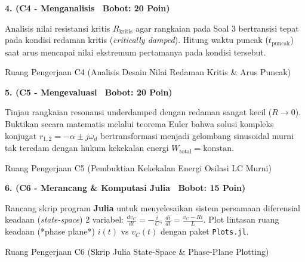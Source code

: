 \documentclass[10pt,a4paper]{article}
\begin{document}
\noindent\textbf{4. (C4 - Menganalisis \textbar\ Bobot: 20 Poin)}\par\vspace{0.5mm}
{\footnotesize Analisis nilai resistansi kritis $R_{\text{kritis}}$ agar rangkaian pada Soal 3 bertransisi tepat pada kondisi redaman kritis (\textit{critically damped}). Hitung waktu puncak ($t_{\text{puncak}}$) saat arus mencapai nilai ekstremum pertamanya pada kondisi tersebut.}
\begin{answerbox}{Ruang Pengerjaan C4 (Analisis Desain Nilai Redaman Kritis \& Arus Puncak)}
  \vspace{3.8cm}
\end{answerbox}

\vspace{1.5mm}

\noindent\textbf{5. (C5 - Mengevaluasi \textbar\ Bobot: 20 Poin)}\par\vspace{0.5mm}
{\footnotesize Tinjau rangkaian resonansi underdamped dengan redaman sangat kecil ($R \to 0$). Buktikan secara matematis melalui teorema Euler bahwa solusi kompleks konjugat $r_{1,2} = -\alpha \pm j\omega_d$ bertransformasi menjadi gelombang sinusoidal murni tak teredam dengan hukum kekekalan energi $W_{\text{total}} = \text{konstan}$.}
\begin{answerbox}{Ruang Pengerjaan C5 (Pembuktian Kekekalan Energi Osilasi LC Murni)}
  \vspace{3.8cm}
\end{answerbox}

\vspace{1.5mm}

\noindent\textbf{6. (C6 - Merancang \& Komputasi Julia \textbar\ Bobot: 15 Poin)}\par\vspace{0.5mm}
{\footnotesize Rancang skrip program \textbf{Julia} untuk menyelesaikan sistem persamaan diferensial keadaan (\textit{state-space}) 2 variabel: $\frac{dv_C}{dt} = -\frac{i}{C}$, $\frac{di}{dt} = \frac{v_C - R i}{L}$. Plot lintasan ruang keadaan (*phase plane*) $i(t)$ vs $v_C(t)$ dengan paket \texttt{Plots.jl}.}
\begin{answerbox}{Ruang Pengerjaan C6 (Skrip Julia State-Space \& Phase-Plane Plotting)}
  \vspace{3.8cm}
\end{answerbox}

\vspace{1.5mm}
\end{document}

